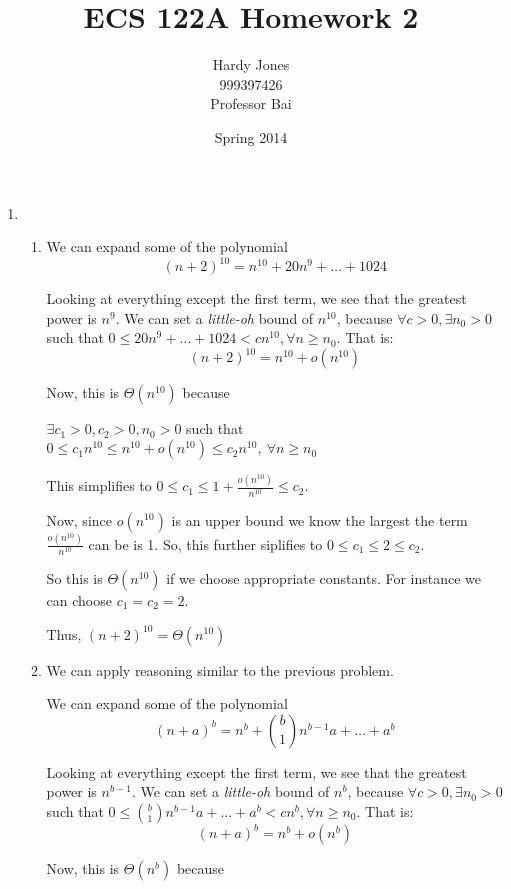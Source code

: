 \documentclass[12pt,letterpaper]{article}
\title{ECS 122A Homework 2\vspace{-2ex}}
\author{Hardy Jones\\
        999397426\\
        Professor Bai\vspace{-2ex}}
\date{Spring 2014}
\begin{document}
  \maketitle

  \begin{enumerate}
    \item
      \begin{enumerate}
        \item
          We can expand some of the polynomial
          \[(n + 2)^{10} = n^{10} + 20n^9 + \dots + 1024\]

          Looking at everything except the first term, we see that the greatest power is $n^9$.
          We can set a \textit{little-oh} bound of $n^{10}$,
          because $\forall c > 0, \exists n_0 > 0$ such that $0 \le 20n^9 + \dots + 1024 < cn^{10}, \forall n \ge n_0$.
          That is:
          \[(n + 2)^{10} = n^{10} + o(n^{10})\]

          Now, this is $\Theta(n^{10})$ because

          $\exists c_1 > 0, c_2 > 0, n_0 > 0$ such that $0 \le c_1n^{10} \le n^{10} + o(n^{10}) \le c_2n^{10}, \ \forall n \ge n_0$

          This simplifies to $0 \le c_1 \le 1 + \frac{o(n^{10})}{n^{10}} \le c_2$.

          Now, since $o(n^{10})$ is an upper bound we know the largest the term $\frac{o(n^{10})}{n^{10}}$ can be is 1.
          So, this further siplifies to $0 \le c_1 \le 2 \le c_2$.

          So this is $\Theta(n^{10})$ if we choose appropriate constants.
          For instance we can choose $c_1 = c_2 = 2$.

          Thus, $(n + 2)^{10} = \Theta(n^{10})$

        \item
          We can apply reasoning similar to the previous problem.

          We can expand some of the polynomial
          \[(n + a)^b = n^b + \binom{b}{1}n^{b-1}a + \dots + a^b\]

          Looking at everything except the first term, we see that the greatest power is $n^{b-1}$.
          We can set a \textit{little-oh} bound of $n^b$,
          because $\forall c > 0, \exists n_0 > 0$ such that $0 \le \binom{b}{1}n^{b-1}a + \dots + a^b < cn^b, \forall n \ge n_0$.
          That is:
          \[(n + a)^b = n^b + o(n^b)\]

          Now, this is $\Theta(n^b)$ because


\end{enumerate}
\end{enumerate}
\end{document}
